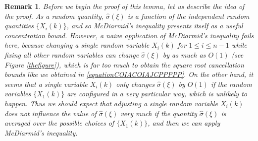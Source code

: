 \documentclass[dvipsnames,letterpaper,12pt]{article}
\numberwithin{equation}{section}
\newtheorem{remark}[theorem]{Remark}
\numberwithin{theorem}{section}
\begin{document}
\begin{remark}
    Before we begin the proof of this lemma, let us describe the idea of the proof. As a random quantity, $\widehat{\sigma}(\xi)$ is a function of the independent random quantities $\{ X_i(k) \}$, and so McDiarmid's inequality presents itself as a useful concentration bound. However, a naive application of McDiarmid's inequality fails here, because changing a single random variable $X_i(k)$ for $1 \leq i \leq n-1$ while fixing all other random variables can change $\widehat{\sigma}(\xi)$ by as much as $O(1)$ (see Figure \ref{thefigure}), which is far too much to obtain the square root cancellation bounds like we obtained in \eqref{equationCOIACOIAJCPPPPP}. On the other hand, it seems that a single variable $X_i(k)$ only changes $\widehat{\sigma}(\xi)$ by $O(1)$ if the random variables $\{ X_1(k) \}$ are configured in a very particular way, which is unlikely to happen. Thus we should expect that adjusting a single random variable $X_i(k)$ does not influence the value of $\widehat{\sigma}(\xi)$ very much if the quantity $\widehat{\sigma}(\xi)$ is \emph{averaged} over the possible choices of $\{ X_1(k) \}$, and then we can apply McDiarmid's inequality.
\end{remark}
\end{document}
